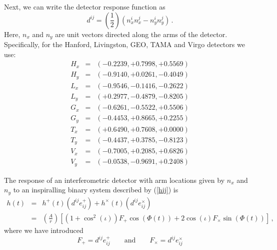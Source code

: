 \begin{entry}
Next, we can write the detector response function as
%
\begin{equation}
  d^{ij} = \left(\frac{1}{2} \right) \left( n_{x}^{i} n_{x}^{j} 
      - n_{y}^{i} n_{y}^{j} \right) \, .
\end{equation}
%
Here, $n_{x}$ and $n_{y}$ are unit vectors directed along the arms of the
detector.  Specifically, for the Hanford, Livingston, GEO, TAMA and Virgo
detectors we use:
%
\begin{eqnarray}
  H_{x} &=& ( -0.2239, +0.7998, +0.5569 ) \nonumber \\
  H_{y} &=& ( -0.9140, +0.0261, -0.4049 ) \\
  L_{x} &=& ( -0.9546, -0.1416, -0.2622 ) \nonumber \\
  L_{y} &=& ( +0.2977, -0.4879, -0.8205 ) \\
  G_{x} &=& ( -0.6261, -0.5522, +0.5506 ) \nonumber \\
  G_{y} &=& ( -0.4453, +0.8665, +0.2255 ) \\
  T_{x} &=& ( +0.6490, +0.7608, +0.0000 ) \nonumber \\
  T_{y} &=& ( -0.4437, +0.3785, -0.8123 ) \label{tarm} \\
  V_{x} &=& ( -0.7005, +0.2085, +0.6826 ) \nonumber \\
  V_{y} &=& ( -0.0538, -0.9691, +0.2408 )
\end{eqnarray} 
%

The response of an interferometric detector with arm locations given by $n_{x}$
and $n_{y}$ to an inspiralling binary system described by (\ref{hij}) is
%
\begin{eqnarray}
  h(t) &=& h^{+}(t) ( d^{ij} e^{+}_{ij} ) 
    + h^{\times}(t) ( d^{ij} e^{\times}_{ij} ) \nonumber \\
      &=& 
    \left(\frac{A}{r}\right) \left[  
	( 1 + \cos^2 ( \iota ) ) F_{+} \cos( \Phi(t)) + 
        2 \cos( \iota ) F_{\times} \sin( \Phi(t) ) \right] \, ,
\end{eqnarray}
%
where we have introduced
%
\begin{equation}
  F_{+} = d^{ij} e^{+}_{ij} \qquad \mathrm{and} \qquad  
  F_{\times} = d^{ij} e^{\times}_{ij}
\end{equation}
%  


\end{entry}
